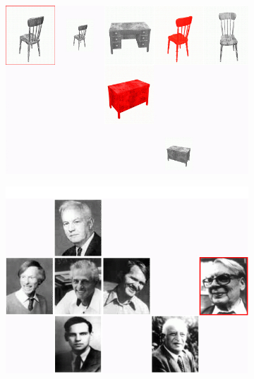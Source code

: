 



\begin{figure}[!ht]
\begin{subfigure}{.5\textwidth}
\centering
\vspace*{.1cm}
\includegraphics[width=\textwidth]{images/largeGreyChair.jpg}\\[0pt]
\caption{}
\label{fig-TUNA-furniture}
\end{subfigure}
\hspace*{0cm}
\begin{subfigure}{.5\textwidth}
\centering
\vspace*{-.8cm}
\includegraphics[width=\textwidth]{images/tuna-people.jpg}\\[0pt]

\end{subfigure}
\end{figure}
